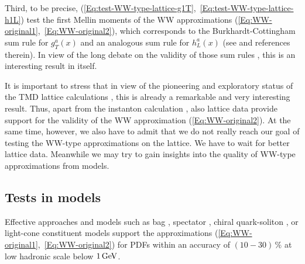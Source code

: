 \documentclass[a4paper,11pt]{article}
\begin{document}
Third, to be precise,
(\ref{Eq:test-WW-type-lattice-g1T},~\ref{Eq:test-WW-type-lattice-h1L})
test the first Mellin moments of the WW approximations
(\ref{Eq:WW-original1},~\ref{Eq:WW-original2}), which corresponds to the
Burkhardt-Cottingham sum rule for $g_T^a(x)$ and an analogous sum rule for
$h_L^a(x)$ (see \cite{Jaffe:1996zw} and references therein).
In view of the long debate on the validity of those sum rules
\cite{Burkardt:2001iy,Bass:2003vp,Efremov:2002qh}, this is
an interesting result in itself.

It is important to stress that in view of the pioneering and
exploratory status of the TMD lattice calculations
\cite{Hagler:2009mb,Musch:2010ka}, this is already a remarkable and very
interesting result. Thus, apart from the instanton calculation
\cite{Dressler:1999hc}, also lattice data provide support for
the validity of the WW approximation (\ref{Eq:WW-original2}).
At the same time, however, we also have to admit that we do
not really reach our goal of testing the WW-type approximations
on the lattice. We have to wait for better lattice data.
Meanwhile we may try to gain insights into the quality of
WW-type approximations from models.





\subsection{Tests in models}
\label{Sec-3.6:models}

Effective approaches and models such as bag
\cite{Jaffe:1991ra,Stratmann:1993aw,Signal:1996ct,Avakian:2010br},
spectator \cite{Jakob:1997wg}, chiral quark-soliton
\cite{Wakamatsu:2000ex}, or light-cone
constituent \cite{Pasquini:2008ax,Lorce:2011dv} models
support the approximations (\ref{Eq:WW-original1},~\ref{Eq:WW-original2})
for PDFs within an accuracy of $(10-30)\,\%$ at low hadronic scale
below $1\,{\rm GeV}$.
\end{document}
